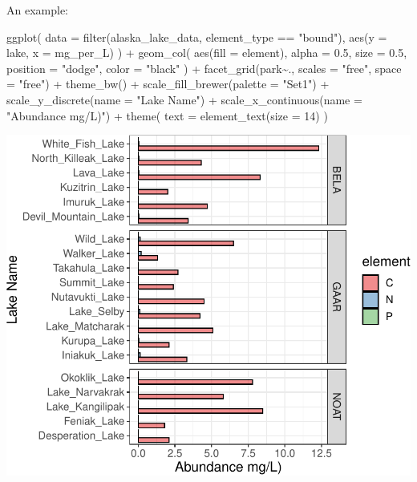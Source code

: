 \documentclass[
]{krantz}
\newenvironment{Shaded}{\begin{snugshade}}{\end{snugshade}}
\newcommand{\AttributeTok}[1]{\textcolor[rgb]{0.77,0.63,0.00}{#1}}
\newcommand{\DecValTok}[1]{\textcolor[rgb]{0.00,0.00,0.81}{#1}}
\newcommand{\FloatTok}[1]{\textcolor[rgb]{0.00,0.00,0.81}{#1}}
\newcommand{\FunctionTok}[1]{\textcolor[rgb]{0.00,0.00,0.00}{#1}}
\newcommand{\NormalTok}[1]{#1}
\newcommand{\SpecialCharTok}[1]{\textcolor[rgb]{0.00,0.00,0.00}{#1}}
\newcommand{\StringTok}[1]{\textcolor[rgb]{0.31,0.60,0.02}{#1}}
\begin{document}
An example:

\begin{Shaded}
\begin{Highlighting}[]
\FunctionTok{ggplot}\NormalTok{(}
  \AttributeTok{data =} \FunctionTok{filter}\NormalTok{(alaska\_lake\_data, element\_type }\SpecialCharTok{==} \StringTok{"bound"}\NormalTok{),}
  \FunctionTok{aes}\NormalTok{(}\AttributeTok{y =}\NormalTok{ lake, }\AttributeTok{x =}\NormalTok{ mg\_per\_L)}
\NormalTok{) }\SpecialCharTok{+}
  \FunctionTok{geom\_col}\NormalTok{(}
    \FunctionTok{aes}\NormalTok{(}\AttributeTok{fill =}\NormalTok{ element),}
    \AttributeTok{alpha =} \FloatTok{0.5}\NormalTok{, }\AttributeTok{size =} \FloatTok{0.5}\NormalTok{, }\AttributeTok{position =} \StringTok{"dodge"}\NormalTok{,}
    \AttributeTok{color =} \StringTok{"black"}
\NormalTok{  ) }\SpecialCharTok{+}
  \FunctionTok{facet\_grid}\NormalTok{(park}\SpecialCharTok{\textasciitilde{}}\NormalTok{., }\AttributeTok{scales =} \StringTok{"free"}\NormalTok{, }\AttributeTok{space =} \StringTok{"free"}\NormalTok{) }\SpecialCharTok{+}
  \FunctionTok{theme\_bw}\NormalTok{() }\SpecialCharTok{+}
  \FunctionTok{scale\_fill\_brewer}\NormalTok{(}\AttributeTok{palette =} \StringTok{"Set1"}\NormalTok{) }\SpecialCharTok{+}
  \FunctionTok{scale\_y\_discrete}\NormalTok{(}\AttributeTok{name =} \StringTok{"Lake Name"}\NormalTok{) }\SpecialCharTok{+}
  \FunctionTok{scale\_x\_continuous}\NormalTok{(}\AttributeTok{name =} \StringTok{"Abundance mg/L)"}\NormalTok{) }\SpecialCharTok{+}
  \FunctionTok{theme}\NormalTok{(}
    \AttributeTok{text =} \FunctionTok{element\_text}\NormalTok{(}\AttributeTok{size =} \DecValTok{14}\NormalTok{)}
\NormalTok{  )}
\end{Highlighting}
\end{Shaded}

\begin{center}\includegraphics{index_files/figure-latex/unnamed-chunk-174-1} \end{center}
\end{document}
